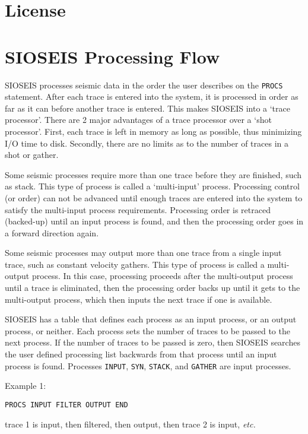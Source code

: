 \chapter{License}


\chapter{SIOSEIS Processing Flow}

SIOSEIS processes seismic data in the order the user describes on the
\texttt{PROCS} statement. After each trace is entered into the system, it is
processed in order as far as it can before another trace is entered. This
makes SIOSEIS into a `trace processor'. There are 2 major advantages of a
trace processor over a `\gls{shot} processor'. First, each trace is left in memory
as long as possible, thus minimizing I/O time to disk. Secondly, there are no
limits as to the number of traces in a \gls{shot} or \gls{gather}.

Some seismic processes require more than one trace before they are finished,
such as stack. This type of process is called a `multi-input' process.
Processing control (or order) can not be advanced until enough traces are
entered into the system to satisfy the multi-input process requirements.
Processing order is retraced (backed-up) until an input process is found, and
then the processing order goes in a forward direction again.

Some seismic processes may output more than one trace from a single input
trace, such as constant velocity \glspl{gather}. This type of process is called a
multi-output process. In this case, processing proceeds after the multi-output
process until a trace is eliminated, then the processing order backs up until
it gets to the multi-output process, which then inputs the next trace if one is
available.

SIOSEIS has a table that defines each process as an input process, or an output
process, or neither. Each process sets the number of traces to be passed to
the next process. If the number of traces to be passed is zero, then SIOSEIS
searches the user defined processing list backwards from that process until an
input process is found. Processes \texttt{INPUT}, \texttt{SYN},
\texttt{STACK}, and \texttt{GATHER} are input processes.

Example 1:
\begin{verbatim}
PROCS INPUT FILTER OUTPUT END
\end{verbatim}
trace 1 is input, then filtered, then output, then trace 2 is input, \textit{etc.}

